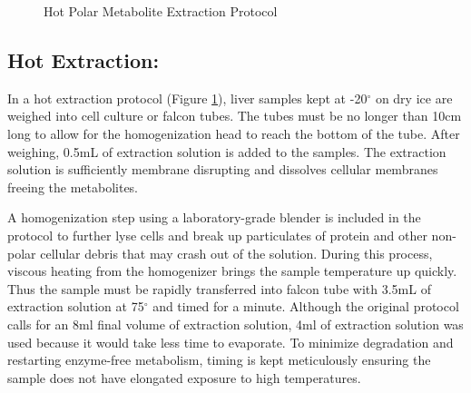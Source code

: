 \documentclass[a4paper]{book}
\begin{document}
	\begin{figure}[b!ht]
		\centering
		\caption{Hot Polar Metabolite Extraction Protocol}
		\label{fig:Hot Extraction Protocol}
	\end{figure}
	
	
	\subsection*{Hot Extraction:}
	
	In a hot extraction protocol (Figure \ref{fig:Hot Extraction Protocol}), liver samples kept at -20$^{\circ}$ on dry ice are weighed into cell culture or falcon tubes. The tubes must be no longer than 10cm long to allow for the homogenization head to reach the bottom of the tube. After weighing, 0.5mL of extraction solution is added to the samples. The extraction solution is sufficiently membrane disrupting and dissolves cellular membranes freeing the metabolites. 
	
	A homogenization step using a laboratory-grade blender is included in the protocol to further lyse cells and break up particulates of protein and other non-polar cellular debris that may crash out of the solution. During this process, viscous heating from the homogenizer brings the sample temperature up quickly. Thus the sample must be rapidly transferred into falcon tube with 3.5mL of extraction solution at 75$^{\circ}$ and timed for a minute. Although the original protocol calls for an 8ml final volume of extraction solution, 4ml of extraction solution was used because it would take less time to evaporate. To minimize degradation and restarting enzyme-free metabolism, timing is kept meticulously ensuring the sample does not have elongated exposure to high temperatures. 
	
\end{document}
